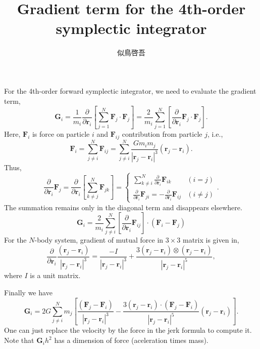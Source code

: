 \documentclass[11pt]{jsarticle}
\title{Gradient term for the 4th-order symplectic integrator}
\author{似鳥啓吾}
\begin{document}
\maketitle

For the 4th-order forward symplectic integrator, we need to evaluate the
gradient term,
\begin{equation}
\bm G_i = \frac{1}{m_i} \frac{\partial}{\partial \bm r_i}
\left[ \sum_{j=1}^N \bm F_j \cdot \bm F_j \right]
= \frac{2}{m_i} \sum_{j=1}^N \left[ \frac{\partial}{\partial \bm r_i} \bm F_j \cdot  \bm F_j \right].
\end{equation}
Here, $\bm F_i$ is force on particle $i$ and $\bm F_{ij}$ contribution from
particle $j$, i.e.,
\begin{equation}
\bm F_i = \sum_{j \neq i}^N \bm F_{ij}
= \sum_{j \neq i}^N \frac{G m_i m_j}{| \bm r_j - \bm r_i |^3}(\bm r_j - \bm r_i).
\end{equation}
Thus,
\begin{equation}
\frac{\partial}{\partial \bm r_i} \bm F_j 
= 
\frac{\partial}{\partial \bm r_i} \left[ \sum_{k \neq j}^N \bm F_{jk} \right]
=
\begin{cases}
\displaystyle \sum_{k \neq i}^N \frac{\partial}{\partial \bm r_i} \bm F_{ik} & (i = j) \\
\displaystyle \frac{\partial}{\partial \bm r_i} \bm F_{ji} = - \frac{\partial}{\partial \bm r_i} \bm F_{ij} & (i \neq j)
\end{cases}.
\end{equation}
The summation remains only in the diagonal term and disappears elsewhere.
\begin{equation}
\bm G_i = \frac{2}{m_i} \sum_{j \neq i}^N \left[ \frac{\partial}{\partial \bm r_i} \bm F_{ij} \right] \cdot \left(\bm F_i - \bm F_j\right)
\end{equation}
For the $N$-body system, gradient of mutual force in $3 \times 3$ matrix is given in,
\begin{equation}
\frac{\partial}{\partial \bm r_i} \frac{(\bm r_j - \bm r_i)}{| \bm r_j - \bm r_i |^3}
=
\frac{-I}{| \bm r_j - \bm r_i |^3}
+
\frac{3 (\bm r_j - \bm r_i) \otimes (\bm r_j - \bm r_i)}{| \bm r_j - \bm r_i |^5},
\end{equation}
where $I$ is a unit matrix.

Finally we have
\begin{equation}
\bm G_i = 2 G \sum_{j \neq i}^N 
  m_j \left[ \frac{(\bm F_j - \bm F_i)}{| \bm r_j - \bm r_i |^3} - \frac{3 (\bm r_j - \bm r_i) \cdot (\bm F_j - \bm F_i)}{| \bm r_j - \bm r_i |^5} (\bm r_j - \bm r_i) \right].
\end{equation}
One can just replace the velocity by the force in the jerk formula to compute it.
Note that $\bm G_i h^2$ has a dimension of force (aceleration times mass).
\end{document}
